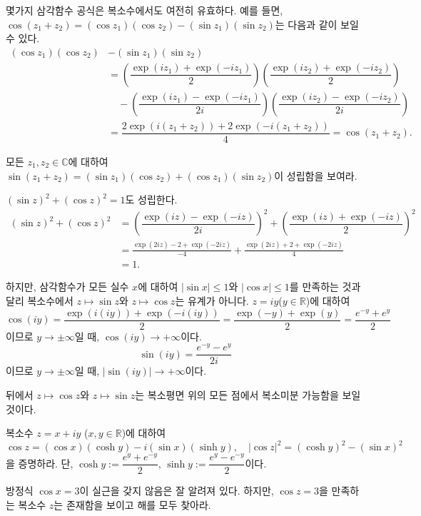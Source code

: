 몇가지 삼각함수 공식은 복소수에서도 여전히 유효하다.
예를 들면, $\cos(z_1+z_2) = (\cos z_1)(\cos z_2) - (\sin z_1)(\sin z_2)$는 
다음과 같이 보일 수 있다.
\begin{align*}
(\cos z_1)(\cos z_2) &- (\sin z_1)(\sin z_2)  \\
&= \left( \dfrac{\exp(iz_1)+\exp(-iz_1)}2\right)
\left( \dfrac{\exp(iz_2)+\exp(-iz_2)}2\right) \\
& \quad - \left( \dfrac{\exp(iz_1)-\exp(-iz_1)}{2i}\right)
\left( \dfrac{\exp(iz_2)-\exp(-iz_2)}{2i}\right) \\
&= \dfrac{2\exp(i(z_1+z_2)) + 2\exp(-i(z_1+z_2))}{4} 
= \cos(z_1+z_2).
\end{align*}

\begin{salt_exercise} \label{ex-1-36}
모든 $z_1, z_2 \in \mathbb C$에 대하여
$\sin(z_1+z_2) = (\sin z_1)(\cos z_2) + (\cos z_1)(\sin z_2)$이 성립함을 보여라.
\end{salt_exercise}

$(\sin z)^2 + (\cos z)^2 = 1$도 성립한다.
\begin{align*}
(\sin z)^2 + (\cos z)^2 
&=  \left(\dfrac{\exp(iz)-\exp(-iz)}{2i}\right)^2
+ \left(\dfrac{\exp(iz)+\exp(-iz)}{2}\right)^2 \\
&= \frac{\exp(2iz) - 2 + \exp(-2iz)}{-4}
+ \frac{\exp(2iz) + 2 + \exp(-2iz)}4 \\
&=1.
\end{align*}

하지만,  삼각함수가 모든 실수 $x$에 대하여
$|\sin x| \le 1$와 $|\cos x|\le 1$를 만족하는 것과 달리
복소수에서 
$z\mapsto \sin z$와 $z\mapsto \cos z$는 유계가 아니다.
$z=iy$($y\in\mathbb R$)에 대하여
$$
\cos (iy) = \frac{\exp(i(iy))+\exp(-i(iy))}2
= \frac{\exp(-y) + \exp(y)}2 = \frac{e^{-y}+e^y}2
$$
이므로
$y\to \pm \infty$일 때, $\cos(iy) \to +\infty$이다.
$$
\sin(iy) = \frac{e^{-y}-e^y}{2i}
$$
이므로 
$y\to \pm \infty$일 때, $|\sin(iy)| \to +\infty$이다.

뒤에서 $z\mapsto \cos z$와 $z\mapsto \sin z$는 
복소평면 위의 모든 점에서 복소미분 가능함을 보일 것이다.


\begin{salt_exercise} \label{ex-1-37}
복소수 $z=x+iy$ ($x,y\in\mathbb R$)에 대하여
$$
\cos z = (\cos x)(\cosh y) - i(\sin x)(\sinh y), \quad
|\cos z|^2 = (\cosh y)^2 - (\sin x)^2
$$
을 증명하라. 단, $\cosh y := \dfrac{e^y+e^{-y}}2$, 
$\sinh y := \dfrac{e^y-e^{-y}}2$이다.
\end{salt_exercise}

\begin{salt_exercise} \label{ex-1-38}
방정식 $\cos x = 3$이 실근을 갖지 않음은 잘 알려져 있다.
하지만, $\cos z=3$을 만족하는 복소수 $z$는 존재함을 보이고
해를 모두 찾아라.
\end{salt_exercise}

